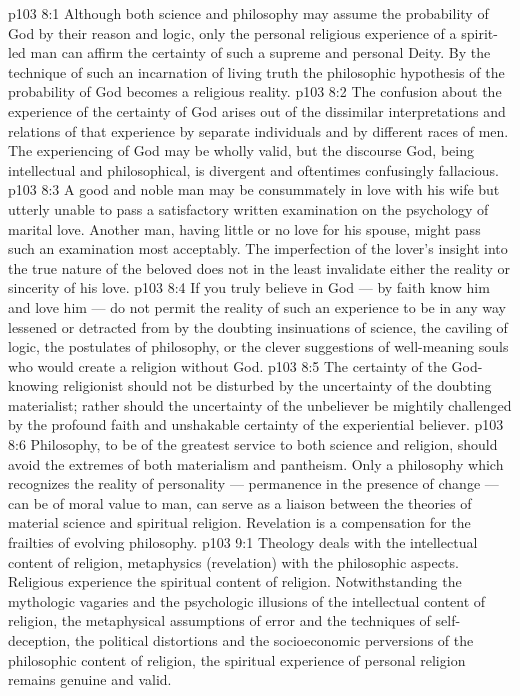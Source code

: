 \vs p103 8:1 Although both science and philosophy may assume the probability of God by their reason and logic, only the personal religious experience of a spirit\hyp{}led man can affirm the certainty of such a supreme and personal Deity. By the technique of such an incarnation of living truth the philosophic hypothesis of the probability of God becomes a religious reality.
\vs p103 8:2 The confusion about the experience of the certainty of God arises out of the dissimilar interpretations and relations of that experience by separate individuals and by different races of men. The experiencing of God may be wholly valid, but the discourse  God, being intellectual and philosophical, is divergent and oftentimes confusingly fallacious.
\vs p103 8:3 A good and noble man may be consummately in love with his wife but utterly unable to pass a satisfactory written examination on the psychology of marital love. Another man, having little or no love for his spouse, might pass such an examination most acceptably. The imperfection of the lover’s insight into the true nature of the beloved does not in the least invalidate either the reality or sincerity of his love.
\vs p103 8:4 \pc If you truly believe in God --- by faith know him and love him --- do not permit the reality of such an experience to be in any way lessened or detracted from by the doubting insinuations of science, the caviling of logic, the postulates of philosophy, or the clever suggestions of well\hyp{}meaning souls who would create a religion without God.
\vs p103 8:5 The certainty of the God\hyp{}knowing religionist should not be disturbed by the uncertainty of the doubting materialist; rather should the uncertainty of the unbeliever be mightily challenged by the profound faith and unshakable certainty of the experiential believer.
\vs p103 8:6 \pc Philosophy, to be of the greatest service to both science and religion, should avoid the extremes of both materialism and pantheism. Only a philosophy which recognizes the reality of personality --- permanence in the presence of change --- can be of moral value to man, can serve as a liaison between the theories of material science and spiritual religion. Revelation is a compensation for the frailties of evolving philosophy.
\vs p103 9:1 Theology deals with the intellectual content of religion, metaphysics (revelation) with the philosophic aspects. Religious experience  the spiritual content of religion. Notwithstanding the mythologic vagaries and the psychologic illusions of the intellectual content of religion, the metaphysical assumptions of error and the techniques of self\hyp{}deception, the political distortions and the socioeconomic perversions of the philosophic content of religion, the spiritual experience of personal religion remains genuine and valid.
